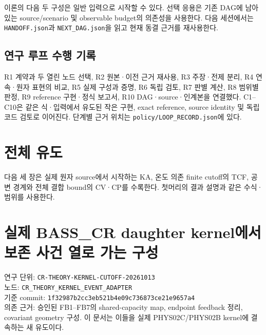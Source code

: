 이론의 다음 두 구성은 일반 입력으로 시작할 수 있다. 선택 응용은 기존 DAG에 남아 있는 source/scenario 및 observable budget의 의존성을 사용한다. 다음 세션에서는 \texttt{HANDOFF.json}과 \texttt{NEXT\_DAG.json}을 읽고 현재 동결 근거를 재사용한다.

\hypertarget{uxc5f0uxad6c-uxb8e8uxd504-uxc218uxd589-uxae30uxb85d}{%
\subsection{연구 루프 수행 기록}\label{uxc5f0uxad6c-uxb8e8uxd504-uxc218uxd589-uxae30uxb85d}}

R1 계약과 두 열린 노드 선택, R2 원본·이전 근거 재사용, R3 주장·전제 분리, R4 연속·원자 표현의 비교, R5 실제 구성과 증명, R6 독립 검토, R7 판별 계산, R8 범위별 판정, R9 reference 구현·정식 보고서, R10 DAG·source·인계본을 연결했다. C1--C10은 같은 식·입력에서 유도된 작은 구현, exact reference, source identity 및 독립 코드 검토로 이어진다. 단계별 근거 위치는 \texttt{policy/LOOP\_RECORD.json}에 있다.

\hypertarget{uxc804uxccb4-uxc720uxb3c4}{%
\section{전체 유도}\label{uxc804uxccb4-uxc720uxb3c4}}

다음 세 장은 실제 원자 source에서 시작하는 KA, 온도 의존 finite cutoff의 TCF, 공변 경계와 전체 결합 bound의 CV·CP를 수록한다. 첫머리의 결과 설명과 같은 수식·범위를 사용한다.

\clearpage

\hypertarget{uxc2e4uxc81c-bass_cr-daughter-kerneluxc5d0uxc11c-uxbcf4uxc874-uxc0acuxac74-uxc5f4uxb85c-uxac00uxb294-uxad6cuxc131}{%
\section{실제 BASS\_CR daughter kernel에서 보존 사건 열로 가는 구성}\label{uxc2e4uxc81c-bass_cr-daughter-kerneluxc5d0uxc11c-uxbcf4uxc874-uxc0acuxac74-uxc5f4uxb85c-uxac00uxb294-uxad6cuxc131}}

연구 단위: \nolinkurl{CR-THEORY-KERNEL-CUTOFF-20261013}\\
노드: \nolinkurl{CR_THEORY_KERNEL_EVENT_ADAPTER}\\
기준 commit: \nolinkurl{1f32987b2cc3eb521b4e09c736873ce21e9657a4}\\
의존 근거: 승인된 FB1--FB7의 shared-capacity map, endpoint feedback 정리, covariant geometry 구성. 이 문서는 이들을 실제 PHYS02C/PHYS02B kernel에 결속하는 새 유도이다.

